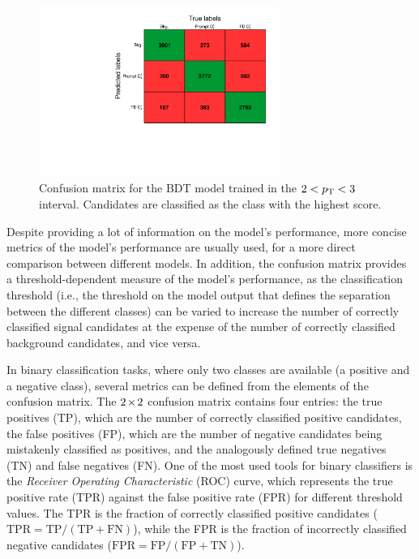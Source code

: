\begin{figure}
    \centering
    \includegraphics[width=0.7\textwidth]{Figures/Chapter 5/ConfusionMatrix.pdf}
    \caption{Confusion matrix for the BDT model trained in the \mbox{$2<p_\mathrm{T}<3$~\gevc} interval. Candidates are classified as the class with the highest score.}
    \label{fig:ml_confusion_matrix}
\end{figure}

Despite providing a lot of information on the model's performance, more concise metrics of the model's performance are usually used, for a more direct comparison between different models. In addition, the confusion matrix provides a threshold-dependent measure of the model's performance, as the classification threshold (i.e., the threshold on the model output that defines the separation between the different classes) can be varied to increase the number of correctly classified signal candidates at the expense of the number of correctly classified background candidates, and vice versa. 

In binary classification tasks, where only two classes are available (a positive and a negative class), several metrics can be defined from the elements of the confusion matrix. The $2\mkern-2mu\times\mkern-2mu2$ confusion matrix contains four entries: the true positives (TP), which are the number of correctly classified positive candidates, the false positives (FP), which are the number of negative candidates being mistakenly classified as positives, and the analogously defined true negatives (TN) and false negatives (FN). One of the most used tools for binary classifiers is the \emph{Receiver Operating Characteristic} (ROC) curve, which represents the true positive rate (TPR) against the false positive rate (FPR) for different threshold values. The TPR is the fraction of correctly classified positive candidates ($\mathrm{TPR = TP/(TP+FN)}$), while the FPR is the fraction of incorrectly classified negative candidates ($\mathrm{FPR = FP/(FP+TN)}$). 

